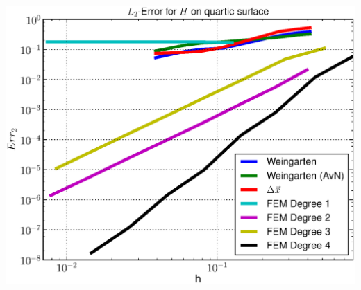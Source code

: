 \documentclass{beamer}
\begin{document}
\begin{frame}
\begin{overprint}
\begin{minipage}[t]{0.49\textwidth}
            \centering\includegraphics[width=\textwidth]{bilder/Curvature/heineB/ErrHL2.eps}
          \end{minipage}
    \end{overprint}
  \end{frame}
\end{document}
